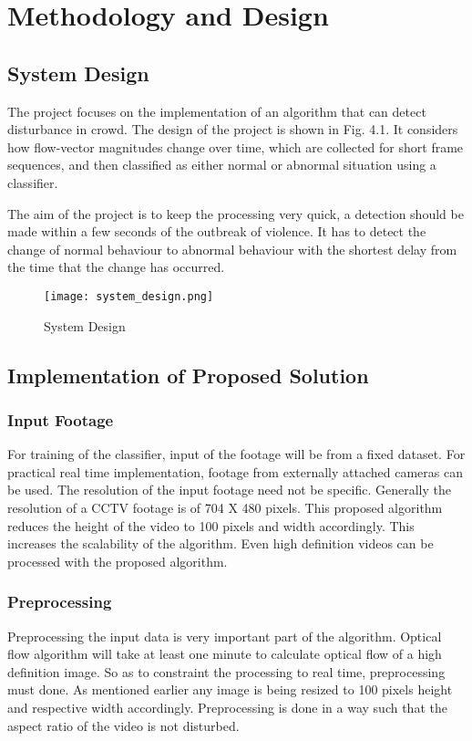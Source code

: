 \chapter{Methodology and Design}
\section{System Design}
The project focuses on the implementation of an algorithm that can detect disturbance in crowd. The design of the project is shown in Fig. 4.1. It considers how flow-vector magnitudes change over time, which are collected for short frame sequences, and then classified as either normal or abnormal situation using a classifier.
\par
The aim of the project is to keep the processing very quick, a detection should be made within a few seconds of the outbreak of violence. It has to detect the change of normal behaviour to abnormal behaviour with the shortest delay from the time that the change has occurred.

\begin{figure}[H]
\centering
\texttt{[image: system\_design.png]}
\caption{System Design}
\end{figure}

\section{Implementation of Proposed Solution}
\subsection{Input Footage}
For training of the classifier, input of the footage will be from a fixed dataset. For practical real time implementation, footage from externally attached cameras can be used. The resolution of the input footage need not be specific. Generally the resolution of a CCTV footage is of 704 X 480 pixels. This proposed algorithm reduces the height of the video to 100 pixels and width accordingly. This increases the scalability of the algorithm. Even high definition videos can be processed with the proposed algorithm.
\subsection{Preprocessing}
Preprocessing the input data is very important part of the algorithm. Optical flow algorithm will take at least one minute to calculate optical flow of a high definition image. So as to constraint the processing to real time, preprocessing must done. As mentioned earlier any image is being resized to 100 pixels height and respective width accordingly. Preprocessing is done in a way such that the aspect ratio of the video is not disturbed.
